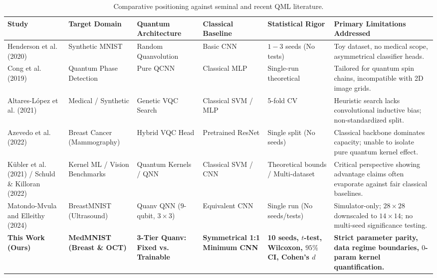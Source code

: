 \documentclass[journal]{IEEEtran}
\begin{document}
\begin{table}[t]
\caption{Comparative positioning against seminal and recent QML literature.}
\label{tab:literature}
\centering
\small
\begin{tabularx}{\textwidth}{@{}p{3.2cm} L L L L L@{}}
\toprule
\textbf{Study} & \textbf{Target Domain} & \textbf{Quantum Architecture} & \textbf{Classical Baseline} & \textbf{Statistical Rigor} & \textbf{Primary Limitations Addressed} \\
\midrule
Henderson et al. (2020) \cite{henderson2020quanvolutional} & Synthetic MNIST & Random Quanvolution & Basic CNN & $1 - 3$ seeds (No tests) & Toy dataset, no medical scope, asymmetrical classifier heads. \\
\midrule
Cong et al. (2019) \cite{cong2019quantum} & Quantum Phase Detection & Pure QCNN & Classical MLP & Single-run theoretical & Tailored for quantum spin chains, incompatible with 2D image grids. \\
\midrule
Altares-L{\'o}pez et al. (2021) \cite{altares2021automatic} & Medical / Synthetic & Genetic VQC Search & Classical SVM / MLP & 5-fold CV & Heuristic search lacks convolutional inductive bias; non-standardized split. \\
\midrule
Azevedo et al. (2022) \cite{azevedo2022quantum} & Breast Cancer (Mammography) & Hybrid VQC Head & Pretrained ResNet & Single split (No seeds) & Classical backbone dominates capacity; unable to isolate pure quantum kernel effect. \\
\midrule
K{\"u}bler et al. (2021) \cite{kubler2021inductive} / Schuld \& Killoran (2022) \cite{schuld2022advantage} & Kernel ML / Vision Benchmarks & Quantum Kernels / QNN & Classical SVM / CNN & Theoretical bounds / Multi-dataset & Critical perspective showing advantage claims often evaporate against fair classical baselines. \\
\midrule
Matondo-Mvula and Elleithy (2024) \cite{matondo2024breast} & BreastMNIST (Ultrasound) & Quanv QNN ($9$-qubit, $3\times3$) & Equivalent CNN & Single run (No seeds/tests) & Simulator-only; $28\times28$ downscaled to $14\times14$; no multi-seed significance testing. \\
\midrule
\textbf{This Work (Ours)} & \textbf{MedMNIST (Breast \& OCT)} & \textbf{3-Tier Quanv: Fixed vs. Trainable} & \textbf{Symmetrical 1:1 Minimum CNN} & \textbf{10 seeds, $t$-test, Wilcoxon, $95\%$ CI, Cohen's $d$} & \textbf{Strict parameter parity, data regime boundaries, $0$-param kernel quantification.} \\
\bottomrule
\end{tabularx}
\end{table}
\end{document}
